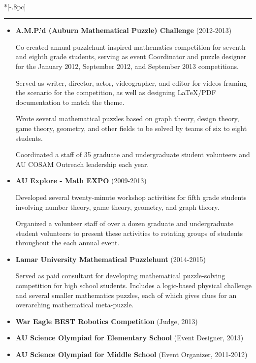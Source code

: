 \documentclass{article}
\newcommand{\headerText}[1]{
  \noindent{\large \bf #1} \\*[-.8pc]
  \rule{\textwidth}{.1pt}}
\begin{document}
\vfill


\headerText{Outreach}
\begin{itemize}
  \item
    \textbf{A.M.P.'d (Auburn Mathematical Puzzle) Challenge} (2012-2013)

    Co-created annual puzzlehunt-inspired mathematics competition for seventh
    and eighth
    grade students, serving as event Coordinator and puzzle designer for the
    January 2012, September 2012, and September 2013 competitions.

    Served as writer, director, actor, videographer, and editor for videos
    framing the scenario for the competition, as well as designing \LaTeX{}/PDF
    documentation to match the theme.

    Wrote several mathematical puzzles based on graph theory,
    design theory, game theory, geometry, and other fields to be solved by
    teams of six to eight students.

    Coordinated a staff of 35 graduate and undergraduate student volunteers
    and AU COSAM Outreach leadership each year.

  \item
    \textbf{AU Explore - Math EXPO} (2009-2013)

    Developed several twenty-minute workshop activities for fifth grade students
    involving number theory, game theory, geometry, and graph theory.

    Organized a volunteer staff of over a dozen graduate and undergraduate
    student volunteers to present these activities to rotating groups
    of students throughout the each annual event.

  \item
    \textbf{Lamar University Mathematical Puzzlehunt} (2014-2015)

    Served as paid consultant for developing mathematical puzzle-solving
    competition for high school students. Includes a logic-based physical
    challenge and several smaller mathematics puzzles, each of which gives
    clues for an overarching mathematical meta-puzzle.

  \item
    \textbf{War Eagle BEST Robotics Competition} (Judge, 2013)

  \item
    \textbf{AU Science Olympiad for Elementary School} (Event Designer, 2013)

  \item
    \textbf{AU Science Olympiad for Middle School} (Event Organizer, 2011-2012)
\end{itemize}
\end{document}
